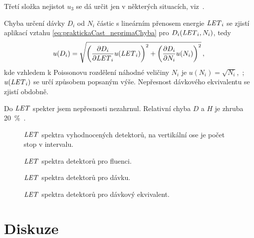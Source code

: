 Třetí složka nejistot $u_3$ se dá určit jen v některých situacích, viz~\cite{nejistoty}.

Chyba určení dávky $D_i$ od $N_i$ částic s lineárním přenosem energie $\mathit{LET}_i$ se zjistí aplikací vztahu \eqref{eq:praktickaCast_neprimaChyba} pro $D_i(\mathit{LET}_i,N_i)$, tedy 
\begin{equation}
  u(D_i)=\sqrt{\left(\frac{\partial D_i}{\partial\mathit{LET}_i}u(\mathit{LET}_i)\right)^2+\left(\frac{\partial D_i}{\partial N_i}u(N_i)\right)^2}\,,
  \label{eq:praktickaCast_chybaDavka}
\end{equation}
kde vzhledem k Poissonovu rozdělení náhodné veličiny $N_i$ je $u(N_i)=\sqrt{N_i}$,~\cite{thesisKPBrabcova}; $u(\mathit{LET}_i)$ se určí způsobem popsaným výše. Nepřesnost dávkového ekvivalentu se zjistí obdobně.

Do $\mathit{LET}$ spekter jsem nepřesnosti nezahrnul. Relativní chyba $D$ a $H$ je zhruba 20~\%~\cite{nejistoty}.
\begin{figure}[H]
  \centering
	\centering
	
	\caption{$\mathit{LET}$ spektra vyhodnocených detektorů, na vertikální ose je počet stop v intervalu.}
	\label{fig:praktickaCast_LETcetnost}
\end{figure}
\begin{figure}[H]
  \centering
	\centering
	
	\caption{$\mathit{LET}$ spektra detektorů pro fluenci.}
	\label{fig:praktickaCast_LETfluence}
\end{figure}
\begin{figure}[H]
  \centering
	\centering
	
	\caption{$\mathit{LET}$ spektra detektorů pro dávku.}
	\label{fig:praktickaCast_LETdavka}
\end{figure}
\begin{figure}[H]
  \centering
	\centering
	
	\caption{$\mathit{LET}$ spektra detektorů pro dávkový ekvivalent.}
	\label{fig:praktickaCast_LETdavkEkvivalent}
\end{figure}
\newpage
\section{Diskuze}

